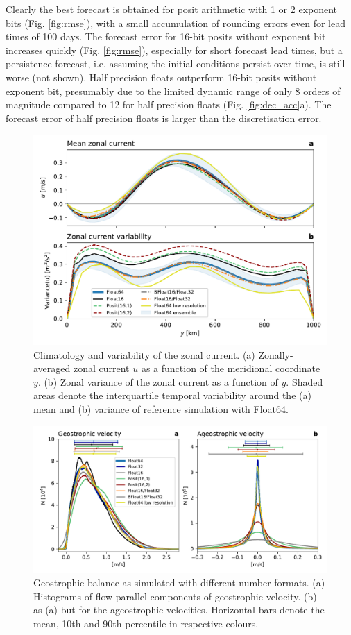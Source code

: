 \documentclass[draft]{agujournal2019}
\begin{document}
Clearly the best forecast is obtained for posit arithmetic with 1 or 2 exponent bits (Fig. \ref{fig:rmse}), with a small accumulation of rounding errors even for lead times of 100 days. The forecast error for 16-bit posits without exponent bit increases quickly (Fig. \ref{fig:rmse}), especially for short forecast lead times, but a persistence forecast, i.e. assuming the initial conditions persist over time, is still worse (not shown). Half precision floats outperform 16-bit posits without exponent bit, presumably due to the limited dynamic range of only 8 orders of magnitude compared to 12 for half precision floats (Fig. \ref{fig:dec_acc}a). The forecast error of half precision floats is larger than the discretisation error.

\begin{figure}
\includegraphics[width=1\textwidth]{../plots/meanvar_u.pdf}
\caption{Climatology and variability of the zonal current. (a) Zonally-averaged zonal current $u$ as a function of the meridional coordinate $y$. (b) Zonal variance of the zonal current as a function of $y$. Shaded areas denote the interquartile temporal variability around the (a) mean and (b) variance of reference simulation with Float64.}
\label{fig:mean}
\end{figure}

\begin{figure}
\includegraphics[width=1\textwidth]{../plots/ageostrophic.pdf}
\caption{Geostrophic balance as simulated with different number formats. (a) Histograms of flow-parallel components of geostrophic velocity. (b) as (a) but for the ageostrophic velocities. Horizontal bars denote the mean, 10th and 90th-percentile in respective colours.}
\label{fig:mean}
\end{figure}
\end{document}
